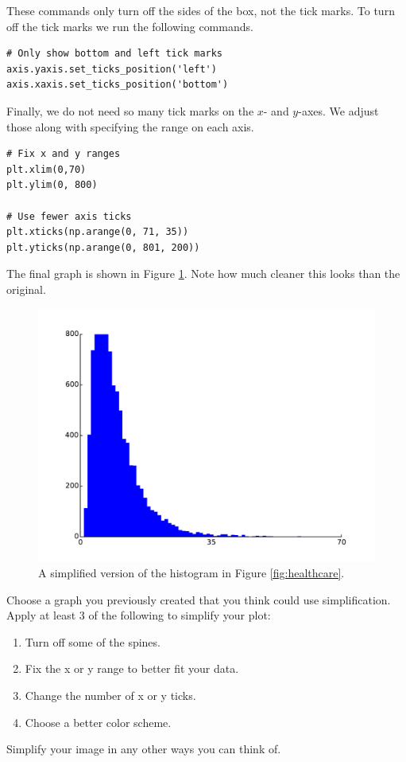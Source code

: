 These commands only turn off the sides of the box, not the tick marks. 
To turn off the tick marks we run the following commands. 

\begin{lstlisting}
# Only show bottom and left tick marks
axis.yaxis.set_ticks_position('left')
axis.xaxis.set_ticks_position('bottom')
\end{lstlisting}

Finally, we do not need so many tick marks on the $x$- and $y$-axes. 
We adjust those along with specifying the range on each axis.

\begin{lstlisting}
# Fix x and y ranges
plt.xlim(0,70)
plt.ylim(0, 800)

# Use fewer axis ticks
plt.xticks(np.arange(0, 71, 35))
plt.yticks(np.arange(0, 801, 200))
\end{lstlisting}

The final graph is shown in Figure \ref{fig:simplify}. 
Note how much cleaner this looks than the original.

\begin{figure}
\centering
\includegraphics[width=\textwidth]{simplify.pdf}
\caption{A simplified version of the histogram in Figure \ref{fig:healthcare}.}
\label{fig:simplify}
\end{figure}


\begin{problem}
Choose a graph you previously created that you think could use simplification. 
Apply at least 3 of the following to simplify your plot:
\begin{enumerate}
\item Turn off some of the spines.
\item Fix the x or y range to better fit your data.
\item Change the number of x or y ticks.
\item Choose a better color scheme.
\end{enumerate}
Simplify your image in any other ways you can think of.
\end{problem}

